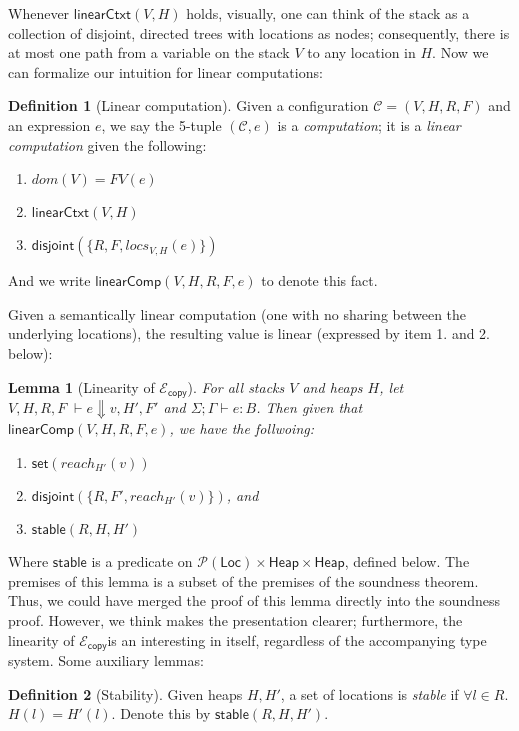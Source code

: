 \documentclass{easychair}
\newcommand{\ms}[1]{\ensuremath{\mathsf{#1}}}
\newcommand{\na}[1]{\mathsf{linearCtxt}(#1)}
\newcommand{\stable}[1]{\mathsf{stable}(#1)}
\newcommand{\dist}[1]{\mathsf{disjoint}(#1)}
\newcommand{\wfc}[5]{\mathsf{linearComp}(#1,#2,#3,#4,#5)}
\newcommand{\copySem}{\ensuremath{\mathcal{E}_{\ms{copy}}}}
\newtheorem{lemma}[theorem]{Lemma}
\theoremstyle{definition}
\newtheorem{definition}{Definition}
\begin{document}
Whenever $\na{V,H}$ holds, visually, one can think of the 
stack as a collection of disjoint, directed trees with locations as nodes; 
consequently, there is at 
most one path from a variable on the stack $V$ to any location in $H$. Now we can 
formalize our intuition for linear computations: 

\begin{definition}[Linear computation]
Given a configuration $\mathcal{C} = (V,H,R,F)$ and an expression $e$, 
we say the 5-tuple $(\mathcal{C},e)$ is a \emph{computation}; it is a \emph{linear computation} 
given the following:
\begin{enumerate}
\item $dom(V) = FV(e)$
\item $\na{V,H}$
\item $\dist{\{R,F,locs_{V,H}(e)\}}$
\end{enumerate} 
And we write $\wfc{V}{H}{R}{F}{e}$ to denote this fact.
\end{definition}

Given a semantically linear computation 
(one with no sharing between the underlying locations), the resulting value is linear 
(expressed by item 1. and 2. below):
\begin{lemma}[Linearity of \copySem]\label{itm:na}
For all stacks $V$ and heaps $H$, let  $V,H,R,F \; \vdash e \Downarrow v, H', F'$ 
and $\Sigma; \Gamma \vdash e : B$. Then given that $\wfc{V}{H}{R}{F}{e}$, we have the follwoing: 
\begin{enumerate}
\item $\ms{set}(reach_{H'}(v))$
\item $\dist{\{R,F',reach_{H'}(v)\}}$, and
\item $\stable{R,H,H'}$
\end{enumerate}
\end{lemma}

Where $\ms{stable}$ is a predicate on $\mathcal{P}(\ms{Loc}) \times \ms{Heap} \times \ms{Heap}$, defined
below. The premises of this lemma is a subset of the premises of the soundness theorem. 
Thus, we could have
merged the proof of this lemma directly into the soundness proof. However, we think makes the 
presentation clearer; furthermore, the linearity of \copySem is an interesting in itself, 
regardless of the accompanying type system. Some auxiliary lemmas:

\begin{definition}[Stability]
Given heaps $H,H'$, a set of locations is \emph{stable} if $\forall l \in R$. $H(l) = H'(l)$. Denote this by
$\stable{R,H,H'}$.
\end{definition}
\end{document}
